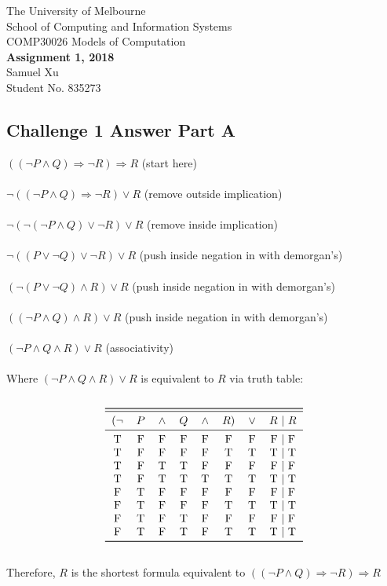 \documentclass[12pt]{article}
\newcommand{\impl}{\mathbin{\Rightarrow}}
\newcommand\tab[1][1cm]{\hspace*{#1}}
\begin{document}
\begin{center}
{\sc The University of Melbourne
\\
School of Computing and Information Systems
\\ 
COMP30026 Models of Computation}
\bigskip \\
{\Large\bf Assignment 1, 2018}
\bigskip \\
Samuel Xu \\
Student No. 835273
\end{center}

\subsection*{Challenge 1 Answer Part A}
$((\neg P \land Q) \impl \neg R) \impl R$ \tab (start here) \\\\
$\neg ((\neg P \land Q) \impl \neg R) \lor R$ \tab (remove outside implication) \\\\
$\neg (\neg (\neg P \land Q) \lor \neg R) \lor R$ \tab (remove inside implication) \\\\
$\neg ((P \lor \neg Q) \lor \neg R) \lor R$ \tab (push inside negation in with demorgan's) \\\\
$(\neg (P \lor \neg Q) \land R) \lor R$ \tab (push inside negation in with demorgan's) \\\\
$((\neg P \land Q) \land R) \lor R$ \tab (push inside negation in with demorgan's) \\\\
$(\neg P \land Q \land R) \lor R$ \tab (associativity) \\\\
Where $(\neg P \land Q \land R) \lor R$ is equivalent to $R$ via truth table:\\\\
\[
\begin{tabular}{*{9}{c}}
\toprule
\midrule
${(}\neg$ & $P$ & $\land$ & $Q$ & $\land$ & $R{)}$ & $\lor$ & $R$ | $R$ \\
\midrule
   T & F & F & F & F & F & F & F | F \\
   T & F & F & F & F & T & T & T | T \\
   T & F & T & T & F & F & F & F | F \\
   T & F & T & T & T & T & T & T | T \\
   F & T & F & F & F & F & F & F | F \\
   F & T & F & F & F & T & T & T | T \\
   F & T & F & T & F & F & F & F | F \\
   F & T & F & T & F & T & T & T | T \\
\bottomrule
\end{tabular}
\]
\\
Therefore, $R$ is the shortest formula equivalent to $((\neg P \land Q) \impl \neg R) \impl R$
\end{document}
